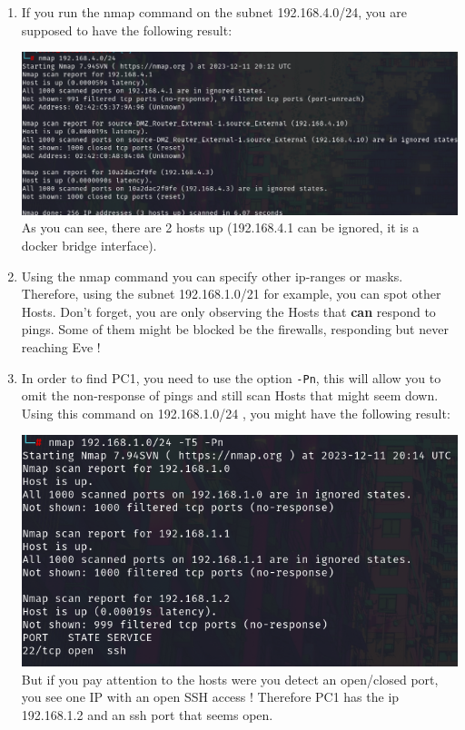 \documentclass[a4paper,11pt,singlespacing]{article}
\begin{document}
\begin{enumerate}
\def\labelenumi{\arabic{enumi}.}
\item
  If you run the nmap command on the subnet 192.168.4.0/24, you are
  supposed to have the following result:

  \includegraphics{./Images/Image07.png}
  \newline  As you can see, there are 2 hosts up (192.168.4.1 can be
  ignored, it is a docker bridge interface).
\item
  Using the nmap command you can specify other ip-ranges or masks.
  Therefore, using the subnet 192.168.1.0/21 for example, you can spot
  other Hosts. Don't forget, you are only observing the Hosts that
  \textbf{can} respond to pings. Some of them might be blocked be the
  firewalls, responding but never reaching Eve !
\item
  In order to find PC1, you need to use the option \texttt{-Pn}, this
  will allow you to omit the non-response of pings and still scan Hosts
  that might seem down. Using this command on 192.168.1.0/24 , you might
  have the following result:

  \includegraphics{./Images/Image08.png}
  But if you pay attention to the hosts were you detect an open/closed
  port, you see one IP with an open SSH access ! Therefore PC1 has the
  ip 192.168.1.2 and an ssh port that seems open.
\end{enumerate}
\end{document}
